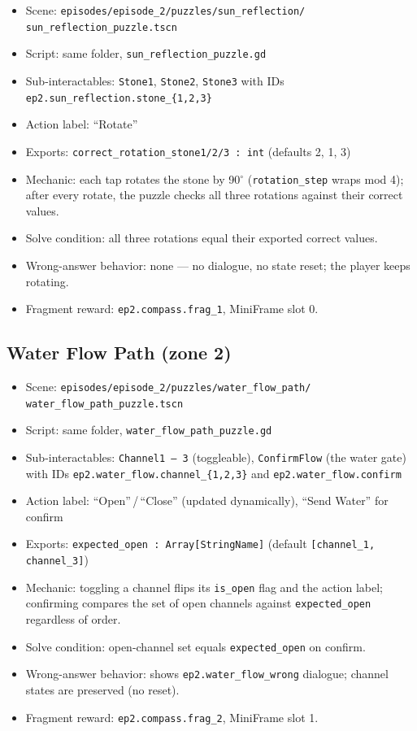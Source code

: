 \documentclass[12pt, a4paper]{article}
\begin{document}
\begin{itemize}[nosep]
  \item Scene: \texttt{episodes/episode\_2/puzzles/sun\_reflection/} \texttt{sun\_reflection\_puzzle.tscn}
  \item Script: same folder, \texttt{sun\_reflection\_puzzle.gd}
  \item Sub-interactables: \texttt{Stone1}, \texttt{Stone2}, \texttt{Stone3}
        with IDs \texttt{ep2.sun\_reflection.stone\_\{1,2,3\}}
  \item Action label: ``Rotate''
  \item Exports: \texttt{correct\_rotation\_stone1/2/3 : int} (defaults 2, 1, 3)
  \item Mechanic: each tap rotates the stone by 90$^\circ$ (\texttt{rotation\_step}
        wraps mod 4); after every rotate, the puzzle checks all three rotations
        against their correct values.
  \item Solve condition: all three rotations equal their exported correct values.
  \item Wrong-answer behavior: none --- no dialogue, no state reset; the player
        keeps rotating.
  \item Fragment reward: \texttt{ep2.compass.frag\_1}, MiniFrame slot 0.
\end{itemize}

\subsection{Water Flow Path (zone 2)}

\begin{itemize}[nosep]
  \item Scene: \texttt{episodes/episode\_2/puzzles/water\_flow\_path/} \texttt{water\_flow\_path\_puzzle.tscn}
  \item Script: same folder, \texttt{water\_flow\_path\_puzzle.gd}
  \item Sub-interactables: \texttt{Channel1\,--\,3} (toggleable), \texttt{ConfirmFlow}
        (the water gate) with IDs \texttt{ep2.water\_flow.channel\_\{1,2,3\}}
        and \texttt{ep2.water\_flow.confirm}
  \item Action label: ``Open''\,/\,``Close'' (updated dynamically), ``Send Water'' for confirm
  \item Exports: \texttt{expected\_open : Array[StringName]} (default
        \texttt{[channel\_1, channel\_3]})
  \item Mechanic: toggling a channel flips its \texttt{is\_open} flag and the
        action label; confirming compares the set of open channels against
        \texttt{expected\_open} regardless of order.
  \item Solve condition: open-channel set equals \texttt{expected\_open} on confirm.
  \item Wrong-answer behavior: shows \texttt{ep2.water\_flow\_wrong} dialogue;
        channel states are preserved (no reset).
  \item Fragment reward: \texttt{ep2.compass.frag\_2}, MiniFrame slot 1.
\end{itemize}
\end{document}
